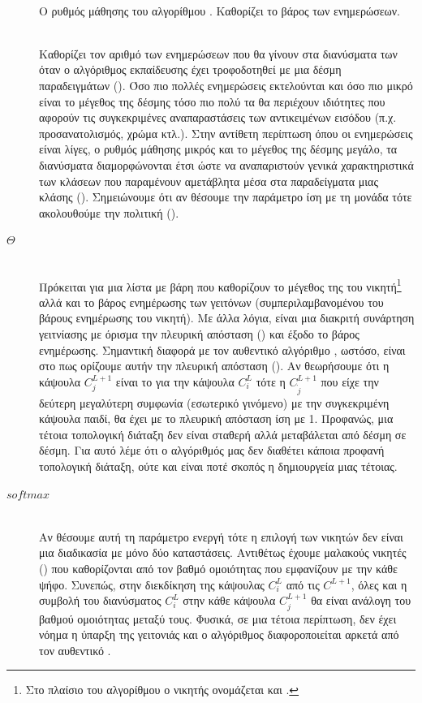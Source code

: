 \begin{description}
  \item[] \hfill \\
  Ο ρυθμός μάθησης του αλγορίθμου . Καθορίζει το βάρος των ενημερώσεων.
  \item[] \hfill \\
  Καθορίζει τον αριθμό των ενημερώσεων που θα γίνουν στα διανύσματα των  όταν ο αλγόριθμος εκπαίδευσης έχει τροφοδοτηθεί με μια δέσμη παραδειγμάτων (). Όσο πιο πολλές ενημερώσεις εκτελούνται και όσο πιο μικρό είναι το μέγεθος της δέσμης τόσο πιο πολύ τα  θα περιέχουν ιδιότητες που αφορούν τις συγκεκριμένες αναπαραστάσεις των αντικειμένων εισόδου (π.χ. προσανατολισμός, χρώμα κτλ.). Στην αντίθετη περίπτωση όπου οι ενημερώσεις είναι λίγες, ο ρυθμός μάθησης  μικρός και το μέγεθος της δέσμης μεγάλο, τα διανύσματα  διαμορφώνονται έτσι ώστε να αναπαριστούν γενικά χαρακτηριστικά των κλάσεων που παραμένουν αμετάβλητα μέσα στα παραδείγματα μιας κλάσης (). Σημειώνουμε ότι αν θέσουμε την παράμετρο ίση με τη μονάδα τότε ακολουθούμε την πολιτική  ().
  \item[$\Theta$] \hfill \\
  Πρόκειται για μια λίστα με βάρη που καθορίζουν το μέγεθος της  του νικητή\footnote{Στο πλαίσιο του αλγορίθμου  ο νικητής ονομάζεται και .} αλλά και το βάρος ενημέρωσης των γειτόνων (συμπεριλαμβανομένου του βάρους ενημέρωσης του νικητή). Με άλλα λόγια, είναι μια διακριτή συνάρτηση γειτνίασης με όρισμα την πλευρική απόσταση () και έξοδο το βάρος ενημέρωσης. Σημαντική διαφορά με τον αυθεντικό αλγόριθμο , ωστόσο, είναι στο πως ορίζουμε αυτήν την πλευρική απόσταση (). Αν θεωρήσουμε ότι η κάψουλα $C_j^{L+1}$ είναι το  για την κάψουλα $C_i^L$ τότε η $C^{L+1}_{\grave{j}}$ που είχε την δεύτερη μεγαλύτερη συμφωνία (εσωτερικό γινόμενο) με την συγκεκριμένη κάψουλα παιδί, θα έχει με το  πλευρική απόσταση ίση με 1. Προφανώς, μια τέτοια τοπολογική διάταξη δεν είναι σταθερή αλλά μεταβάλεται από δέσμη σε δέσμη. Για αυτό λέμε ότι ο αλγόριθμός μας δεν διαθέτει κάποια προφανή τοπολογική διάταξη, ούτε και είναι ποτέ σκοπός η δημιουργεία μιας τέτοιας.
  \item[$softmax$] \hfill \\
  Αν θέσουμε αυτή τη παράμετρο ενεργή τότε η επιλογή των νικητών δεν είναι μια διαδικασία με μόνο δύο καταστάσεις. Αντιθέτως έχουμε μαλακούς νικητές () που καθορίζονται από τον βαθμό ομοιότητας που εμφανίζουν με την κάθε ψήφο. Συνεπώς, στην διεκδίκηση της κάψουλας $C_i^L$ από τις $C^{L+1}$, όλες  και η συμβολή του διανύσματος  $C_i^L$ στην κάθε κάψουλα $C^{L+1}_j$ θα είναι ανάλογη του βαθμού ομοιότητας μεταξύ τους. Φυσικά, σε μια τέτοια περίπτωση, δεν έχει νόημα η ύπαρξη της γειτονιάς και ο αλγόριθμος διαφοροποιείται αρκετά από τον αυθεντικό .

\end{description}
